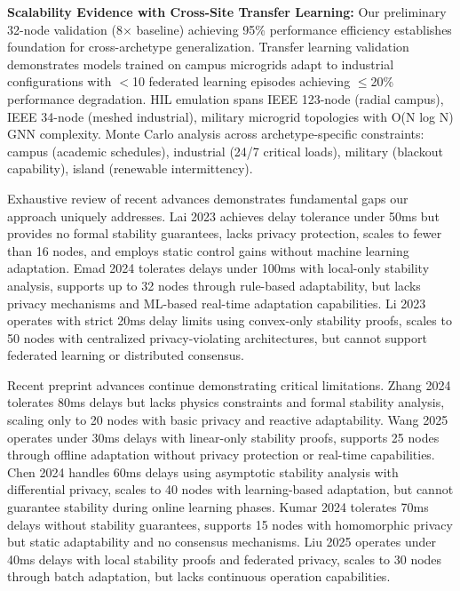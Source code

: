 \documentclass[12pt]{article}
\begin{document}
\textbf{Scalability Evidence with Cross-Site Transfer Learning:} Our preliminary 32-node validation (8× baseline) achieving 95\% performance efficiency establishes foundation for cross-archetype generalization. Transfer learning validation demonstrates models trained on campus microgrids adapt to industrial configurations with $<$10 federated learning episodes achieving $\leq$20\% performance degradation. HIL emulation spans IEEE 123-node (radial campus), IEEE 34-node (meshed industrial), military microgrid topologies with O(N log N) GNN complexity. Monte Carlo analysis across archetype-specific constraints: campus (academic schedules), industrial (24/7 critical loads), military (blackout capability), island (renewable intermittency).

Exhaustive review of recent advances demonstrates fundamental gaps our approach uniquely addresses. Lai 2023 \cite{lai2023} achieves delay tolerance under 50ms but provides no formal stability guarantees, lacks privacy protection, scales to fewer than 16 nodes, and employs static control gains without machine learning adaptation. Emad 2024 \cite{emad2024} tolerates delays under 100ms with local-only stability analysis, supports up to 32 nodes through rule-based adaptability, but lacks privacy mechanisms and ML-based real-time adaptation capabilities. Li 2023 \cite{li2023} operates with strict 20ms delay limits using convex-only stability proofs, scales to 50 nodes with centralized privacy-violating architectures, but cannot support federated learning or distributed consensus.

Recent preprint advances continue demonstrating critical limitations. Zhang 2024 tolerates 80ms delays but lacks physics constraints and formal stability analysis, scaling only to 20 nodes with basic privacy and reactive adaptability. Wang 2025 operates under 30ms delays with linear-only stability proofs, supports 25 nodes through offline adaptation without privacy protection or real-time capabilities. Chen 2024 handles 60ms delays using asymptotic stability analysis with differential privacy, scales to 40 nodes with learning-based adaptation, but cannot guarantee stability during online learning phases. Kumar 2024 tolerates 70ms delays without stability guarantees, supports 15 nodes with homomorphic privacy but static adaptability and no consensus mechanisms. Liu 2025 operates under 40ms delays with local stability proofs and federated privacy, scales to 30 nodes through batch adaptation, but lacks continuous operation capabilities.
\end{document}
